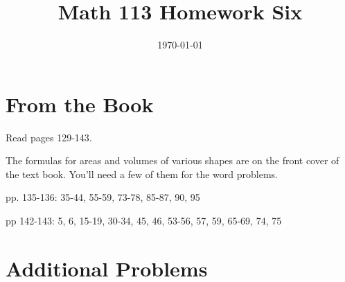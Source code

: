 \documentclass[fleqn,addpoints]{exam}
\title{Math 113 Homework Six}
\author{}
\date{\today}
\begin{document}
\maketitle

\section{From the Book}

Read pages 129-143.

The formulas for areas and volumes of various shapes are on the front cover of the text book.  You'll need a few of them
for the word problems.

\begin{itemize*}
  \item pp. 135-136: 35-44, 55-59, 73-78, 85-87, 90, 95
  \item pp 142-143: 5, 6, 15-19, 30-34, 45, 46, 53-56, 57, 59, 65-69, 74, 75
\end{itemize*}

\section{Additional Problems}
\end{document}
